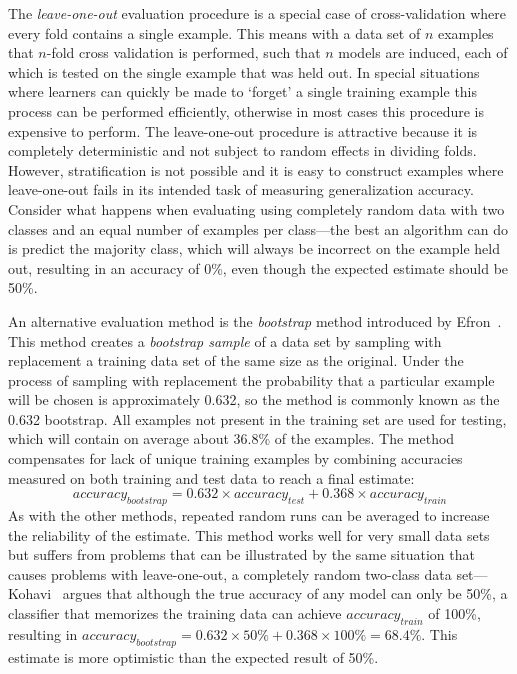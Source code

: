 
The {\em leave-one-out} evaluation procedure is a special case of cross-validation where every fold contains a single example. This means with a data set of $n$ examples that $n$-fold cross validation is performed, such that $n$ models are induced, each of which is tested on the single example that was held out. In special situations where learners can quickly be made to `forget' a single training example this process can be performed efficiently, otherwise in most cases this procedure is expensive to perform. The leave-one-out procedure is attractive because it is completely deterministic and not subject to random effects in dividing folds. However, stratification is not possible and it is easy to construct examples where leave-one-out fails in its intended task of measuring generalization accuracy. Consider what happens when evaluating using completely random data with two classes and an equal number of examples per class---the best an algorithm can do is predict the majority class, which will always be incorrect on the example held out, resulting in an accuracy of 0\%, even though the expected estimate should be 50\%.



An alternative evaluation method is the {\em bootstrap} method introduced by Efron~\cite{bootstrap}. This method creates a {\em bootstrap sample} of a data set by sampling with replacement a training data set of the same size as the original. Under the process of sampling with replacement the probability that a particular example will be chosen is approximately 0.632, so the method is commonly known as the 0.632 bootstrap. All examples not present in the training set are used for testing, which will contain on average about 36.8\% of the examples. The method compensates for lack of unique training examples by combining accuracies measured on both training and test data to reach a final estimate:
\begin{equation} \label{eq:bstrap}
accuracy_{bootstrap} = 0.632 \times accuracy_{test} + 0.368 \times accuracy_{train}
\end{equation}
As with the other methods, repeated random runs can be averaged to increase the reliability of the estimate. This method works well for very small data sets but suffers from problems that can be illustrated by the same situation that causes problems with leave-one-out, a completely random two-class data set---Kohavi~\cite{cvstudy} argues that although the true accuracy of any model can only be 50\%, a classifier that memorizes the training data can achieve $accuracy_{train}$ of 100\%, resulting in $accuracy_{bootstrap} = 0.632 \times 50\% + 0.368 \times 100\% = 68.4\%$. This estimate is more optimistic than the expected result of 50\%.


